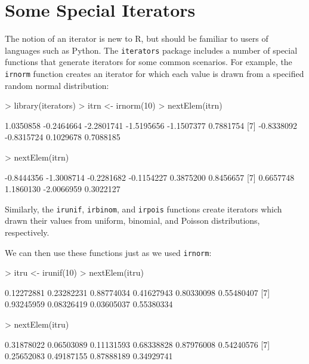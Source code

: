 \documentclass[12pt]{article}
\begin{document}
\section{Some Special Iterators}

The notion of an iterator is new to R, but should be familiar to users of
languages such as Python. The \texttt{iterators} package includes a number of
special functions that generate iterators for some common scenarios. For 
example, the
\texttt{irnorm} function creates an iterator for which each value is drawn
from a specified random normal distribution:
\begin{Schunk}
\begin{Sinput}
> library(iterators)
> itrn <- irnorm(10)
> nextElem(itrn)
\end{Sinput}
\begin{Soutput}
 [1]  1.0350858 -0.2464664 -2.2801741 -1.5195656 -1.1507377  0.7881754
 [7] -0.8338092 -0.8315724  0.1029678  0.7088185
\end{Soutput}
\begin{Sinput}
> nextElem(itrn)
\end{Sinput}
\begin{Soutput}
 [1] -0.8444356 -1.3008714 -0.2281682 -0.1154227  0.3875200  0.8456657
 [7]  0.6657748  1.1860130 -2.0066959  0.3022127
\end{Soutput}
\end{Schunk}

Similarly, the \texttt{irunif}, \texttt{irbinom}, and \texttt{irpois} functions
create iterators which drawn their values from uniform, binomial, and Poisson
distributions, respectively.

We can then use these functions just as we used \texttt{irnorm}:
\begin{Schunk}
\begin{Sinput}
> itru <- irunif(10)
> nextElem(itru)
\end{Sinput}
\begin{Soutput}
 [1] 0.12272881 0.23282231 0.88774034 0.41627943 0.80330098 0.55480407
 [7] 0.93245959 0.08326419 0.03605037 0.55380334
\end{Soutput}
\begin{Sinput}
> nextElem(itru)
\end{Sinput}
\begin{Soutput}
 [1] 0.31878022 0.06503089 0.11131593 0.68338828 0.87976008 0.54240576
 [7] 0.25652083 0.49187155 0.87888189 0.34929741
\end{Soutput}
\end{Schunk}
\end{document}
